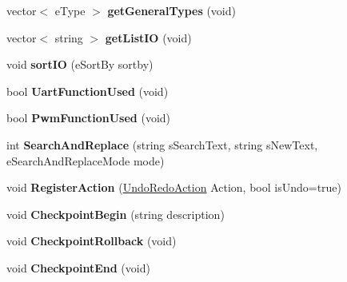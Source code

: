 \begin{DoxyCompactItemize}
\item 
\hypertarget{class_ladder_diagram_aa09574592d738e55cec7b43afbbe80ce}{vector$<$ e\-Type $>$ {\bfseries get\-General\-Types} (void)}\label{class_ladder_diagram_aa09574592d738e55cec7b43afbbe80ce}

\item 
\hypertarget{class_ladder_diagram_add35175f08ab3e9065b3e6cf950ba5d3}{vector$<$ string $>$ {\bfseries get\-List\-I\-O} (void)}\label{class_ladder_diagram_add35175f08ab3e9065b3e6cf950ba5d3}

\item 
\hypertarget{class_ladder_diagram_a6c807a52904fb09df97532ddd326d9ea}{void {\bfseries sort\-I\-O} (e\-Sort\-By sortby)}\label{class_ladder_diagram_a6c807a52904fb09df97532ddd326d9ea}

\item 
\hypertarget{class_ladder_diagram_a6bf4c1be2a1d49baff2ba0323dc9b456}{bool {\bfseries Uart\-Function\-Used} (void)}\label{class_ladder_diagram_a6bf4c1be2a1d49baff2ba0323dc9b456}

\item 
\hypertarget{class_ladder_diagram_a047ce56392a43d5bf9864edd01ce21e5}{bool {\bfseries Pwm\-Function\-Used} (void)}\label{class_ladder_diagram_a047ce56392a43d5bf9864edd01ce21e5}

\item 
\hypertarget{class_ladder_diagram_a139751ceecf039c2216f9daad9659c7b}{int {\bfseries Search\-And\-Replace} (string s\-Search\-Text, string s\-New\-Text, e\-Search\-And\-Replace\-Mode mode)}\label{class_ladder_diagram_a139751ceecf039c2216f9daad9659c7b}

\item 
\hypertarget{class_ladder_diagram_a7196ffbbc4c23d8e36d4f9b61420d6ad}{void {\bfseries Register\-Action} (\hyperlink{struct_undo_redo_action}{Undo\-Redo\-Action} Action, bool is\-Undo=true)}\label{class_ladder_diagram_a7196ffbbc4c23d8e36d4f9b61420d6ad}

\item 
\hypertarget{class_ladder_diagram_a7fe6c5ed600b7a619312889e80405166}{void {\bfseries Checkpoint\-Begin} (string description)}\label{class_ladder_diagram_a7fe6c5ed600b7a619312889e80405166}

\item 
\hypertarget{class_ladder_diagram_a88276d998db591eeb729e1ec81e539b1}{void {\bfseries Checkpoint\-Rollback} (void)}\label{class_ladder_diagram_a88276d998db591eeb729e1ec81e539b1}

\item 
\hypertarget{class_ladder_diagram_ae23a78abb3c19c77d65c0264697dbb8b}{void {\bfseries Checkpoint\-End} (void)}\label{class_ladder_diagram_ae23a78abb3c19c77d65c0264697dbb8b}


\end{DoxyCompactItemize}
